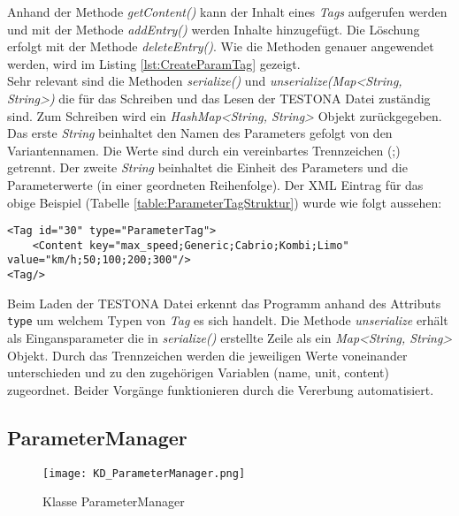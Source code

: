 Anhand der Methode \textit{getContent()} kann der Inhalt eines \textit{Tags} aufgerufen werden und mit der Methode \textit{addEntry()} werden Inhalte hinzugefügt. Die Löschung erfolgt mit der Methode \textit{deleteEntry()}. Wie die Methoden genauer angewendet werden, wird im Listing \ref{lst:CreateParamTag} gezeigt.\\


Sehr relevant sind die Methoden \textit{serialize()} und \textit{unserialize(Map<String, String>)} die für das Schreiben und das Lesen der TESTONA Datei zuständig sind. Zum Schreiben wird ein \textit{HashMap<String, String>} Objekt zurückgegeben. Das erste \textit{String} beinhaltet den Namen des Parameters gefolgt von den Variantennamen. Die Werte sind durch ein vereinbartes Trennzeichen (;)  getrennt. Der zweite \textit{String} beinhaltet die Einheit des Parameters und die Parameterwerte (in einer geordneten Reihenfolge). Der XML Eintrag für das obige Beispiel (Tabelle \ref{table:ParameterTagStruktur}) wurde wie folgt aussehen:\\

\begin{lstlisting}[caption={XML Darstellung eines ParameterTags}, captionpos=b]
<Tag id="30" type="ParameterTag">
	<Content key="max_speed;Generic;Cabrio;Kombi;Limo" value="km/h;50;100;200;300"/>
<Tag/>
\end{lstlisting}


Beim Laden der TESTONA Datei erkennt das Programm anhand des Attributs \texttt{type} um welchem Typen von \textit{Tag} es sich handelt. Die Methode \textit{unserialize} erhält als Eingansparameter die in \textit{serialize()} erstellte Zeile als ein \textit{Map<String, String>} Objekt. Durch das Trennzeichen werden die jeweiligen Werte voneinander unterschieden und zu den zugehörigen Variablen (name, unit, content) zugeordnet. Beider Vorgänge funktionieren durch die Vererbung automatisiert.

\subsection{ParameterManager}\label{sub:ParameterManager}

\begin{figure}[h!]
  \begin{center}
    \texttt{[image: KD\_ParameterManager.png]}
  		  \caption{Klasse ParameterManager}
     \label{kd.ParameterMananger}
  \end{center}
\end{figure}

